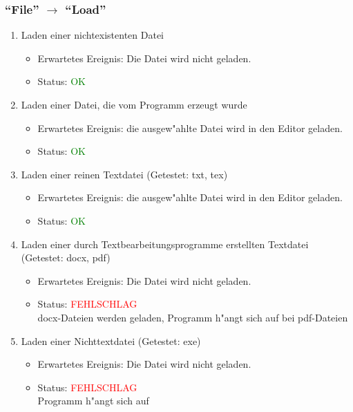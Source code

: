 \subsubsection{"`File"' $\rightarrow$ "`Load"'}
\begin{enumerate}
\item Laden einer nichtexistenten Datei
\begin{itemize}
\item Erwartetes Ereignis: Die Datei wird nicht geladen. 
\item Status: \textcolor{green}{OK} 
\end{itemize}
\item Laden einer Datei, die vom Programm erzeugt wurde
\begin{itemize}
\item Erwartetes Ereignis: die ausgew"ahlte Datei wird in den Editor geladen. 
\item Status: \textcolor{green}{OK}
\end{itemize}
\item Laden einer reinen Textdatei (Getestet: txt, tex)
\begin{itemize}
\item Erwartetes Ereignis: die ausgew"ahlte Datei wird in den Editor geladen. 
\item Status: \textcolor{green}{OK}
\end{itemize}
\item Laden einer durch Textbearbeitungsprogramme erstellten Textdatei (Getestet: docx, pdf)
\begin{itemize}
\item Erwartetes Ereignis: Die Datei wird nicht geladen. 
\item Status: \textcolor{red}{FEHLSCHLAG} \\
docx-Dateien werden geladen, Programm h"angt sich auf bei pdf-Dateien
\end{itemize}
\item Laden einer Nichttextdatei (Getestet: exe)
\begin{itemize}
\item Erwartetes Ereignis: Die Datei wird nicht geladen. 
\item Status: \textcolor{red}{FEHLSCHLAG} \\
Programm h"angt sich auf
\end{itemize}
\end{enumerate}
